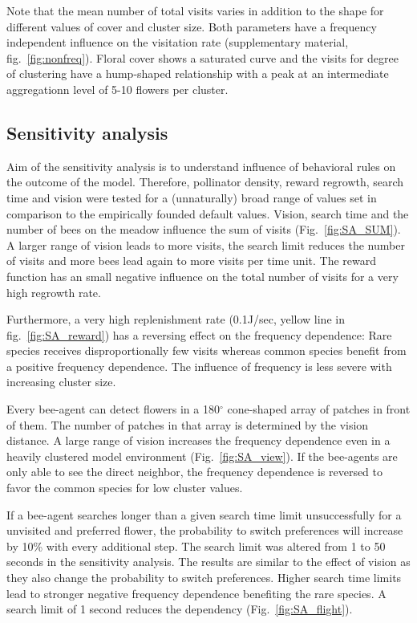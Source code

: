 Note that the mean number of total visits varies in addition to the shape for different values of cover and cluster size. Both parameters have a frequency independent influence on the visitation rate (supplementary material, fig.~\ref{fig:nonfreq}). Floral cover shows a saturated curve and the visits for degree of clustering have a hump-shaped relationship with a peak at an intermediate aggregationn level of 5-10 flowers per cluster.

\subsection*{Sensitivity analysis}
Aim of the sensitivity analysis is to understand influence of behavioral rules on the outcome of the model. Therefore, pollinator density, reward regrowth, search time and vision were tested for a (unnaturally) broad range of values set in comparison to the empirically founded default values. Vision, search time and the number of bees on the meadow influence the sum of visits (Fig.~\ref{fig:SA_SUM}). A larger range of vision leads to more visits, the search limit reduces the number of visits and more bees lead again to more visits per time unit. The reward function has an small negative influence on the total number of visits for a very high regrowth rate.

Furthermore, a very high replenishment rate (0.1J/sec, yellow line in fig.~\ref{fig:SA_reward}) has a reversing effect on the frequency dependence: Rare species receives disproportionally few visits whereas common species benefit from a positive frequency dependence. The influence of frequency is less severe with increasing cluster size. 

Every bee-agent can detect flowers in a 180$^{\circ}$ cone-shaped array of patches in front of them. The number of patches in that array is determined by the vision distance. A large range of vision increases the frequency dependence even in a heavily clustered model environment (Fig.~\ref{fig:SA_view}). If the bee-agents are only able to see the direct neighbor, the frequency dependence is reversed to favor the common species for low cluster values. 

If a bee-agent searches longer than a given search time limit unsuccessfully for a unvisited and preferred flower, the probability to switch preferences will increase by 10\% with every additional step. The search limit was altered from 1 to 50 seconds in the sensitivity analysis. The results are similar to the effect of vision as they also change the probability to switch preferences. Higher search time limits lead to stronger negative frequency dependence benefiting the rare species. A search limit of 1 second reduces the dependency (Fig.~\ref{fig:SA_flight}).

